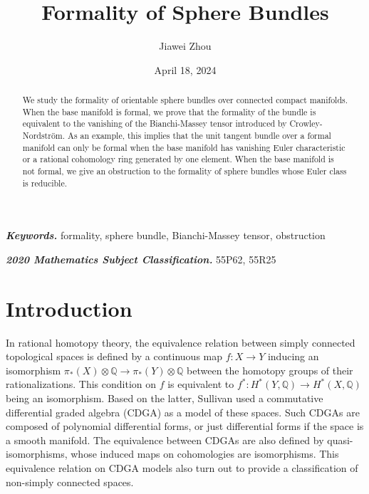 \documentclass{article}
\title{Formality of Sphere Bundles}
\author{Jiawei Zhou}
\date{April 18, 2024}
\theoremstyle{plain}
\theoremstyle{definition}
\theoremstyle{plain}
\numberwithin{equation}{section}
\begin{document}
\maketitle

\begin{abstract}
We study the formality of orientable sphere bundles over connected compact manifolds. When the base manifold is formal, we prove that the formality of the bundle is equivalent to the vanishing of the Bianchi-Massey tensor introduced by Crowley-Nordstr\"{o}m. As an example, this implies that the unit tangent bundle over a formal manifold can only be formal when the base manifold has vanishing Euler characteristic or a rational cohomology ring generated by one element. When the base manifold is not formal, we give an obstruction to the formality of sphere bundles whose Euler class is reducible.
\end{abstract}

\textbf{\textit{Keywords.}} formality, sphere bundle, Bianchi-Massey tensor, obstruction

\textbf{\textit{2020 Mathematics Subject Classification.}} 	55P62, 55R25



\section{Introduction}

In rational homotopy theory, the equivalence relation between simply connected topological spaces is defined by a continuous map $f:X\to Y$ inducing an isomorphism $\pi_*(X)\otimes\mathbb{Q}\to\pi_*(Y)\otimes\mathbb{Q}$ between the homotopy groups of their rationalizations. This condition on $f$ is equivalent to $f^*:H^*(Y,\mathbb{Q})\to H^*(X,\mathbb{Q})$ being an isomorphism. Based on the latter, Sullivan \cite{Sullivan} used a commutative differential graded algebra (CDGA) as a model of these spaces. Such CDGAs are composed of polynomial differential forms, or just differential forms if the space is a smooth manifold. The equivalence between CDGAs are also defined by quasi-isomorphisms, whose induced maps on cohomologies are isomorphisms. This equivalence relation on CDGA models also turn out to provide a classification of non-simply connected spaces.
\end{document}
